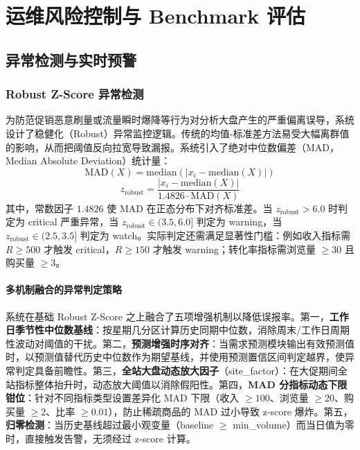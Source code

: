 
\chapter{运维风险控制与 Benchmark 评估}

\section{异常检测与实时预警}

\subsection{Robust Z-Score 异常检测}

为防范促销恶意刷量或流量瞬时爆降等行为对分析大盘产生的严重偏离误导，系统设计了稳健化（Robust）异常监控逻辑。传统的均值-标准差方法易受大幅离群值的影响，从而把阈值反向拉宽导致漏报。系统引入了绝对中位数偏差（MAD，Median Absolute Deviation）统计量：
\begin{equation}
    \text{MAD}(X) = \text{median}\left(\left| x_i - \text{median}(X) \right|\right)
\end{equation}
\begin{equation}
    z_{\text{robust}} = \frac{\left| x_i - \text{median}(X) \right|}{1.4826 \cdot \text{MAD}(X)}
\end{equation}
其中，常数因子 $1.4826$ 使 MAD 在正态分布下对齐标准差。当 $z_{\text{robust}} > 6.0$ 时判定为 critical 严重异常，当 $z_{\text{robust}} \in (3.5, 6.0]$ 判定为 warning，当 $z_{\text{robust}} \in (2.5, 3.5]$ 判定为 watch。实际判定还需满足显著性门槛：例如收入指标需 $R \geq 500$ 才触发 critical，$R \geq 150$ 才触发 warning；转化率指标需浏览量 $\geq 30$ 且购买量 $\geq 3$。

\subsubsection{多机制融合的异常判定策略}

系统在基础 Robust Z-Score 之上融合了五项增强机制以降低误报率。第一，\textbf{工作日季节性中位数基线}：按星期几分区计算历史同期中位数，消除周末/工作日周期性波动对阈值的干扰。第二，\textbf{预测增强时序对齐}：当需求预测模块输出有效预测值时，以预测值替代历史中位数作为期望基线，并使用预测置信区间判定越界，使异常判定具备前瞻性。第三，\textbf{全站大盘动态放大因子}（site\_factor）：在大促期间全站指标整体抬升时，动态放大阈值以消除假阳性。第四，\textbf{MAD 分指标动态下限钳位}：针对不同指标类型设置差异化 MAD 下限（收入 $\geq 100$、浏览量 $\geq 20$、购买量 $\geq 2$、比率 $\geq 0.01$），防止稀疏商品的 MAD 过小导致 z-score 爆炸。第五，\textbf{归零检测}：当历史基线超过最小观变量（baseline $\geq$ min\_volume）而当日值为零时，直接触发告警，无须经过 z-score 计算。

